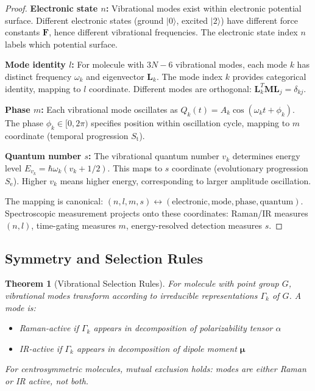 \documentclass[twocolumn,10pt]{article}
\newtheorem{theorem}{Theorem}[section]
\newcommand{\St}{S_{\text{t}}}
\newcommand{\Se}{S_{\text{e}}}
\begin{document}
\begin{proof}
\textbf{Electronic state $n$:} Vibrational modes exist within electronic potential surface. Different electronic states (ground $|0\rangle$, excited $|2\rangle$) have different force constants $\mathbf{F}$, hence different vibrational frequencies. The electronic state index $n$ labels which potential surface.

\textbf{Mode identity $l$:} For molecule with $3N-6$ vibrational modes, each mode $k$ has distinct frequency $\omega_k$ and eigenvector $\mathbf{L}_k$. The mode index $k$ provides categorical identity, mapping to $l$ coordinate. Different modes are orthogonal: $\mathbf{L}_k^T \mathbf{M} \mathbf{L}_j = \delta_{kj}$.

\textbf{Phase $m$:} Each vibrational mode oscillates as $Q_k(t) = A_k \cos(\omega_k t + \phi_k)$. The phase $\phi_k \in [0, 2\pi)$ specifies position within oscillation cycle, mapping to $m$ coordinate (temporal progression $\St$).

\textbf{Quantum number $s$:} The vibrational quantum number $v_k$ determines energy level $E_{v_k} = \hbar\omega_k(v_k + 1/2)$. This maps to $s$ coordinate (evolutionary progression $\Se$). Higher $v_k$ means higher energy, corresponding to larger amplitude oscillation.

The mapping is canonical: $(n, l, m, s) \leftrightarrow (\text{electronic}, \text{mode}, \text{phase}, \text{quantum})$. Spectroscopic measurement projects onto these coordinates: Raman/IR measures $(n, l)$, time-gating measures $m$, energy-resolved detection measures $s$.
\end{proof}

\subsection{Symmetry and Selection Rules}

\begin{theorem}[Vibrational Selection Rules]
\label{thm:vibrational_selection}
For molecule with point group $G$, vibrational modes transform according to irreducible representations $\Gamma_k$ of $G$. A mode is:
\begin{itemize}
\item Raman-active if $\Gamma_k$ appears in decomposition of polarizability tensor $\alpha$
\item IR-active if $\Gamma_k$ appears in decomposition of dipole moment $\boldsymbol{\mu}$
\end{itemize}
For centrosymmetric molecules, mutual exclusion holds: modes are either Raman or IR active, not both.
\end{theorem}
\end{document}

